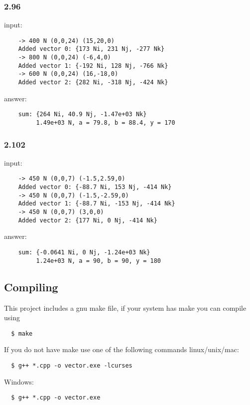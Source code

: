 \documentclass[a4paper, 12pt] {report}
\begin{document}
  \subsubsection*{2.96}
    input:
    \begin{lstlisting}
    -> 400 N (0,0,24) (15,20,0)
    Added vector 0: {173 Ni, 231 Nj, -277 Nk}
    -> 800 N (0,0,24) (-6,4,0)
    Added vector 1: {-192 Ni, 128 Nj, -766 Nk}
    -> 600 N (0,0,24) (16,-18,0)
    Added vector 2: {282 Ni, -318 Nj, -424 Nk}
    \end{lstlisting}
    answer:
    \begin{lstlisting}
    sum: {264 Ni, 40.9 Nj, -1.47e+03 Nk}
         1.49e+03 N, a = 79.8, b = 88.4, y = 170
    \end{lstlisting}

  \subsubsection*{2.102}
    input:
    \begin{lstlisting}
    -> 450 N (0,0,7) (-1.5,2.59,0)
    Added vector 0: {-88.7 Ni, 153 Nj, -414 Nk}
    -> 450 N (0,0,7) (-1.5,-2.59,0)
    Added vector 1: {-88.7 Ni, -153 Nj, -414 Nk}
    -> 450 N (0,0,7) (3,0,0)
    Added vector 2: {177 Ni, 0 Nj, -414 Nk}
    \end{lstlisting}
    answer:
    \begin{lstlisting}
    sum: {-0.0641 Ni, 0 Nj, -1.24e+03 Nk}
         1.24e+03 N, a = 90, b = 90, y = 180
    \end{lstlisting}

\subsection*{Compiling}
This project includes a gnu make file, if your system has make you can compile using

\lstset{language=bash, showstringspaces=false, basicstyle=\scriptsize, 
  columns=fixed, extendedchars=true, 
  frame=single, breaklines=true}
\begin{lstlisting}
  $ make
\end{lstlisting}

If you do not have make use one of the following commands
linux/unix/mac:
\begin{lstlisting}
  $ g++ *.cpp -o vector.exe -lcurses
\end{lstlisting}

Windows:
\begin{lstlisting}
  $ g++ *.cpp -o vector.exe
\end{lstlisting}
\end{document}
